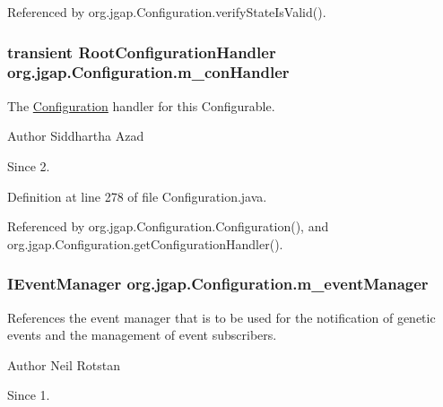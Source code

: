Referenced by org.\-jgap.\-Configuration.\-verify\-State\-Is\-Valid().

\hypertarget{classorg_1_1jgap_1_1_configuration_a1128ebf6ce77d77c7c47671f1013247e}{
\subsubsection[{m\-\_\-con\-Handler}]{\setlength{\rightskip}{0pt plus 5cm}transient Root\-Configuration\-Handler org.\-jgap.\-Configuration.\-m\-\_\-con\-Handler\hspace{0.3cm}{\ttfamily [private]}}}\label{classorg_1_1jgap_1_1_configuration_a1128ebf6ce77d77c7c47671f1013247e}
The \hyperlink{classorg_1_1jgap_1_1_configuration}{Configuration} handler for this Configurable.

\begin{DoxyAuthor}{Author}
Siddhartha Azad 
\end{DoxyAuthor}
\begin{DoxySince}{Since}
2. 
\end{DoxySince}


Definition at line 278 of file Configuration.\-java.



Referenced by org.\-jgap.\-Configuration.\-Configuration(), and org.\-jgap.\-Configuration.\-get\-Configuration\-Handler().

\hypertarget{classorg_1_1jgap_1_1_configuration_af3503f5ca62916503e5f0aa46a6ab910}{
\subsubsection[{m\-\_\-event\-Manager}]{\setlength{\rightskip}{0pt plus 5cm}I\-Event\-Manager org.\-jgap.\-Configuration.\-m\-\_\-event\-Manager\hspace{0.3cm}{\ttfamily [private]}}}\label{classorg_1_1jgap_1_1_configuration_af3503f5ca62916503e5f0aa46a6ab910}
References the event manager that is to be used for the notification of genetic events and the management of event subscribers.

\begin{DoxyAuthor}{Author}
Neil Rotstan 
\end{DoxyAuthor}
\begin{DoxySince}{Since}
1. 
\end{DoxySince}


